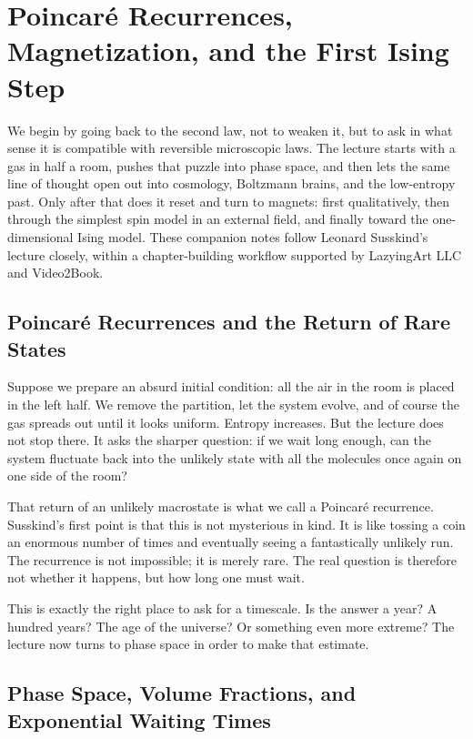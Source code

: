 \chapter{Poincar\'e Recurrences, Magnetization, and the First Ising Step}

We begin by going back to the second law, not to weaken it, but to ask in what sense it is compatible with reversible microscopic laws. The lecture starts with a gas in half a room, pushes that puzzle into phase space, and then lets the same line of thought open out into cosmology, Boltzmann brains, and the low-entropy past. Only after that does it reset and turn to magnets: first qualitatively, then through the simplest spin model in an external field, and finally toward the one-dimensional Ising model. These companion notes follow Leonard Susskind's lecture closely, within a chapter-building workflow supported by LazyingArt LLC and Video2Book.

\section{Poincar\'e Recurrences and the Return of Rare States}

Suppose we prepare an absurd initial condition: all the air in the room is placed in the left half. We remove the partition, let the system evolve, and of course the gas spreads out until it looks uniform. Entropy increases. But the lecture does not stop there. It asks the sharper question: if we wait long enough, can the system fluctuate back into the unlikely state with all the molecules once again on one side of the room?

That return of an unlikely macrostate is what we call a Poincar\'e recurrence. Susskind's first point is that this is not mysterious in kind. It is like tossing a coin an enormous number of times and eventually seeing a fantastically unlikely run. The recurrence is not impossible; it is merely rare. The real question is therefore not whether it happens, but how long one must wait.

This is exactly the right place to ask for a timescale. Is the answer a year? A hundred years? The age of the universe? Or something even more extreme? The lecture now turns to phase space in order to make that estimate.

\section{Phase Space, Volume Fractions, and Exponential Waiting Times}

